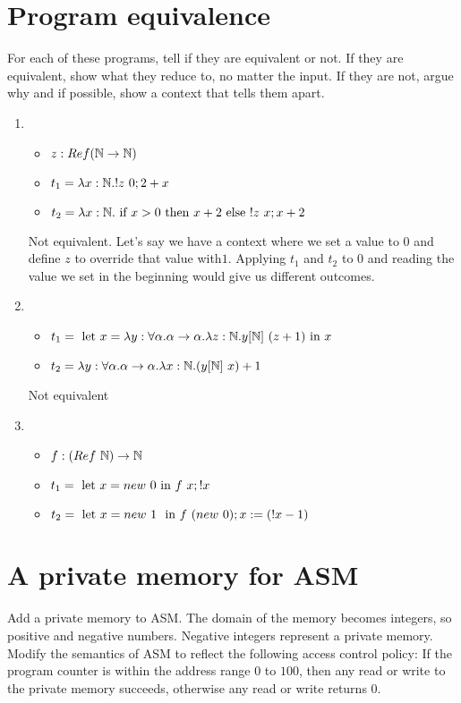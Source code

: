 \documentclass{article}
\begin{document}
\section{Program equivalence}
For each of these programs, tell if they are equivalent or not. If they are equivalent, show what they reduce to, no matter the input. If they are not, argue why and if possible, show a context that tells them apart.
\begin{enumerate}
    \item
        \begin{itemize}
            \item $z:Ref(\mathbb N\to\mathbb N)$
            \item $t_1=\lam{x:\N}{!z\ 0;2+x}$
            \item $t_2=\lam{x:\N}{\IF x>0 \THEN x+2 \ELSE !z\ x;x+2}$
        \end{itemize}
        Not equivalent. Let's say we have a context where we set a value to $0$ and define $z$ to override that value with$1$. Applying $t_1$ and $t_2$ to $0$ and reading the value we set in the beginning would give us different outcomes.
    \item 
        \begin{itemize}
            \item $t_1= \LET x=\lam{y:\forall\alpha.\alpha\to\alpha}\lam{z:\N}{y[\N]\ (z+1)} \TIN x$
            \item $t_2= \lam{y:\forall\alpha.\alpha\to\alpha}\lam{x:\N}{(y[\N]\ x)+1}$
        \end{itemize}
        Not equivalent

    \item 
        \begin{itemize}
            \item $f:(Ref\ \mathbb N)\to\mathbb N$
            \item $t_1=\text{ let } x= new\ 0 \text{ in } f\ x; !x$
            \item $t_2=\text{ let } x= new\ 1\ \text{ in } f\ (new\ 0); x:=(!x-1)$
        \end{itemize}
\end{enumerate}

\section{A private memory for ASM}
Add a private memory to ASM. The domain of the memory becomes integers, so positive and negative numbers. Negative integers represent a private memory. \\
Modify the semantics of ASM to reflect the following access control policy:
If the program counter is within the address range $0$ to $100$, then any read or write to the private memory succeeds, otherwise any read or write returns $0$.
\end{document}
